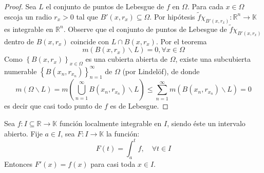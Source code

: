 \documentclass[12pt]{report}
\theoremstyle{largebreak}
\renewcommand{\leq}{\ensuremath{\leqslant}}
\newcommand\cf[3]{\ensuremath{#1:#2\rightarrow#3}}
\begin{document}
    \begin{proof}
        Sea $L$ el conjunto de puntos de Lebesgue de $f$ en $\Omega$. Para cada $x\in\Omega$ escoja un radio $r_x>0$ tal que $B'(x,r_x)\subseteq\Omega$. Por hipótesis $\cf{\tilde{f}\chi_{ B'(x,r_x)}}{\mathbb{R}^n}{\mathbb{K}}$ es integrable en $\mathbb{R}^n$. Observe que el conjunto de puntos de Lebesgue de $\tilde{f}\chi_{ B'(x,r_x)}$ dentro de $B(x,r_x)$ coincide con $L\cap B(x,r_x)$. Por el teorema
        \begin{equation*}
            m(B(x,r_x)\backslash L)=0,\forall x\in\Omega
        \end{equation*}
        Como $\left\{B(x,r_x) \right\}_{x\in\Omega}$ es una cubierta abierta de $\Omega$, existe una subcubierta numerable $\left\{B(x_n,r_{ x_n})\right\}_{n=1}^\infty$ de $\Omega$ (por Lindelöf), de donde
        \begin{equation*}
            m(\Omega\backslash L)=m\left(\bigcup_{ n=1}^\infty B(x_n,r_{ x_n})\backslash L\right)\leq\sum_{ n=1}^\infty m(B(x_n,r_{x_n})\backslash L)=0
        \end{equation*}
        es decir que casi todo punto de $f$ es de Lebesgue.
    \end{proof}
    
    \begin{theor}
        Sea $\cf{f}{I\subseteq\mathbb{R}}{\mathbb{K}}$ función localmente integrable en $I$, siendo éste un intervalo abierto. Fije $a\in I$, sea $\cf{F}{I}{\mathbb{K}}$ la función:
        \begin{equation*}
            F(t)=\int_a^t f,\quad\forall t\in I
        \end{equation*}
        Entonces $F'(x)=f(x)$ para casi toda $x\in I$.
    \end{theor}
\end{document}
